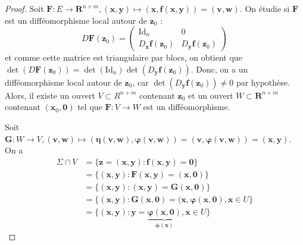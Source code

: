 \begin{proof}
Soit $\boldsymbol{F}:E\to \mathbf{R}^{n+m},(\boldsymbol{x},\boldsymbol{y})\mapsto(\boldsymbol{x},\boldsymbol{f}(\boldsymbol{x},\boldsymbol{y}))=(\boldsymbol{v},\boldsymbol{w})$. On étudie si $\boldsymbol{F}$ est un difféomorphisme local autour de $\boldsymbol{z}_{0}$ :
$$
D\boldsymbol{F}(\boldsymbol{z}_{0})=\begin{pmatrix}
\mathrm{Id}_{n} & 0 \\
D_{\boldsymbol{x}}\boldsymbol{f}(\boldsymbol{z}_{0}) & D_{\boldsymbol{y}}\boldsymbol{f}(\boldsymbol{z}_{0})
\end{pmatrix}
$$
et comme cette matrice est triangulaire par blocs, on obtient que $\det(D\boldsymbol{F}(\boldsymbol{z}_{0}))=\det(\mathrm{Id}_{n})\det(D_{\boldsymbol{y}}\boldsymbol{f}(\boldsymbol{z}_{0}))$. Donc, on a un difféomorphisme local autour de $\boldsymbol{z}_{0}$, car $\det(D_{\boldsymbol{y}}\boldsymbol{f}(\boldsymbol{z}_{0}))\neq0$ par hypothèse. Alors, il existe un ouvert $V\subset R^{n+m}$ contenant $\boldsymbol{z}_{0}$ et un ouvert $W\subset \mathbf{R}^{n+m}$ contenant $(\boldsymbol{x}_{0},\boldsymbol{0})$ tel que $\boldsymbol{F}:V\to W$ est un difféomorphisme.

Soit $\boldsymbol{G}:W\to V,(\boldsymbol{v},\boldsymbol{w})\mapsto (\boldsymbol{\eta}(\boldsymbol{v},\boldsymbol{w}),\boldsymbol{\varphi}(\boldsymbol{v},\boldsymbol{w}))=(\boldsymbol{v},\boldsymbol{\varphi}(\boldsymbol{v},\boldsymbol{w}))=(\boldsymbol{x},\boldsymbol{y})$. On a
\begin{align*}
\Sigma \cap V & =\{ \boldsymbol{z}=(\boldsymbol{x},\boldsymbol{y}):\boldsymbol{f}(\boldsymbol{x},\boldsymbol{y})=\boldsymbol{0}  \} \\
 & =\{ (\boldsymbol{x},\boldsymbol{y}):\boldsymbol{F}(\boldsymbol{x},\boldsymbol{y})=(\boldsymbol{x},\boldsymbol{0}) \} \\
 & =\{ (\boldsymbol{x},\boldsymbol{y}):(\boldsymbol{x},\boldsymbol{y})=\boldsymbol{G}(\boldsymbol{x},\boldsymbol{0}) \} \\
 & =\{ (\boldsymbol{x},\boldsymbol{y}):\boldsymbol{G}(\boldsymbol{x},\boldsymbol{0})=(\boldsymbol{x},\boldsymbol{\varphi}(\boldsymbol{x},\boldsymbol{0}),\boldsymbol{x}\in U \} \\
 & =\{ (\boldsymbol{x},\boldsymbol{y}):\boldsymbol{y}=\underbrace{ \boldsymbol{\varphi}(\boldsymbol{x},\boldsymbol{0} ) }_{ \boldsymbol{\phi}(\boldsymbol{x}) },\boldsymbol{x}\in U \}
\end{align*}


\end{proof}
